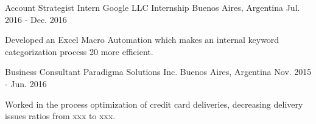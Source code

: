 \begin{cventries}
  \cventry
    {Account Strategist Intern} %
    {Google LLC Internship} %
    {Buenos Aires, Argentina} %
    {Jul. 2016 - Dec. 2016} %
    {
      \begin{cvitems} %
        \item {Developed an Excel Macro Automation which makes an internal keyword categorization process 20 more efficient.}
      \end{cvitems}
    }

  \cventry
    {Business Consultant} %
    {Paradigma Solutions Inc.} %
    {Buenos Aires, Argentina} %
    {Nov. 2015 - Jun. 2016} %
    {
      \begin{cvitems} %
        \item {Worked in the process optimization of credit card deliveries, decreasing delivery issues ratios from xxx to xxx.
        }
      \end{cvitems}
    }

\end{cventries}
